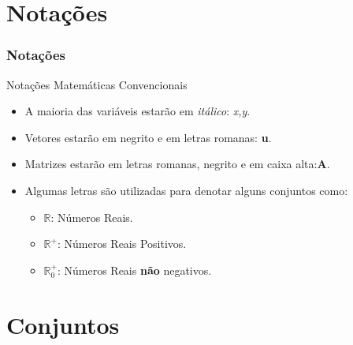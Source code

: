 \documentclass{beamer}
\begin{document}
\section{Notações}
\begin{frame}
\frametitle{Notações}


	\begin{block}{Notações Matemáticas Convencionais}
		\begin{itemize}
			\item<1-> A maioria das variáveis estarão em \textit{itálico}: \textit{x,y}.
			\item<2-> Vetores estarão em negrito e em letras romanas: \textbf{u}.
			\item<3-> Matrizes estarão em letras romanas, negrito e em caixa alta:\textbf{A}.
			\item<4-> Algumas letras são utilizadas para denotar alguns conjuntos como:
				\begin{itemize}
					\item $\mathbb{R}$: Números Reais.
					\item $\mathbb{R}^+$: Números Reais Positivos.
					\item $\mathbb{R}_0^+$: Números Reais \textbf{não} negativos.
				\end{itemize}
		\end{itemize}
	
	\end{block}
	
\end{frame}


\section{Conjuntos}
\end{document}
